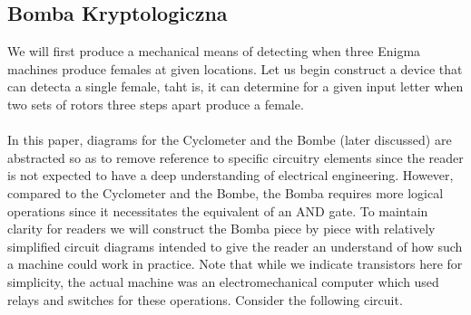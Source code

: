 \subsection{Bomba Kryptologiczna}
We will first produce a mechanical means of detecting when three Enigma machines produce females at given locations. Let us begin construct a device that can detecta a single female, taht is, it can determine for a given input letter when two sets of rotors three steps apart produce a female.
\\\\In this paper, diagrams for the Cyclometer and the Bombe (later discussed) are abstracted so as to remove reference to specific circuitry elements since the reader is not expected to have a deep understanding of electrical engineering. However, compared to the Cyclometer and the Bombe, the Bomba requires more logical operations since it necessitates the equivalent of an AND gate. To maintain clarity for readers we will construct the Bomba piece by piece with relatively simplified circuit diagrams intended to give the reader an understand of how such a machine could work in practice. Note that while we indicate transistors here for simplicity, the actual machine was an electromechanical computer which used relays and switches for these operations. Consider the following circuit.
